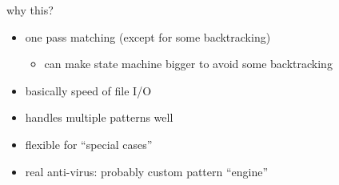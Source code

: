 
\begin{frame}{why this?}
    \begin{itemize}
    \item one pass matching (except for some backtracking)
        \begin{itemize}
        \item can make state machine bigger to avoid some backtracking
        \end{itemize}
    \item basically speed of file I/O
    \item handles multiple patterns well
    \item flexible for ``special cases''
    \vspace{.5cm}
    \item<2> real anti-virus: probably custom pattern ``engine''
    \end{itemize}
\end{frame}


